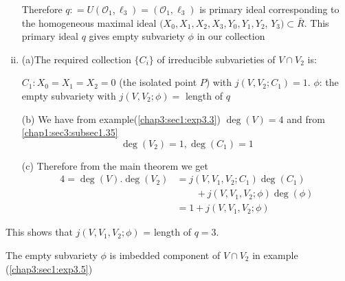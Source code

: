 \begin{example}
\begin{enumerate}[(i)]
   Therefore $q:  = U(\mathscr{O}_1, \ell_3) = (\mathscr{O}_1, \ell_3)
   $ is primary ideal corresponding to the homogeneous maximal ideal
   $(X_0,X_1,X_2,X_3, Y_0,Y_1,Y_2$, $Y_3) \subset \bar{R}$. This primary
   ideal $q$ gives empty subvariety $\phi$ in our collection  

  \item (a)\pageoriginale The required collection $\{C_i\}$ of irreducible
    subvarieties of $V \cap V_2$ is:  

    $C_1:  X_0 = X_1 = X_2 = 0$ (the isolated point $P$) with $j (V,
    V_2 ; C_1) =1$. $\phi$: the empty subvariety with $j (V, V_2 ;
    \phi) =$ length of $q$ 

    (b) We have from example(\ref{chap3:sec1:exp3.3}) $\deg (V) = 4$
    and from \ref{chap1:sec3:subsec1.35} 
    $$
    \deg (V_2) = 1, \deg (C_1) = 1 
    $$
    
    (c) Therefore from the main theorem we get  
    \begin{align*}
      4 = \deg (V). \deg (V_2) &= j(V, V_1,V_2 ;C_1) \deg (C_1)\\ 
      & \qquad + j(V, V_1, V_2 ; \phi) \deg (\phi)\\ 
      &=1+j (V, V_1, V_2 ; \phi)
    \end{align*}
\end{enumerate}
\end{example}

    This shows that $j (V, V_1, V_2 ; \phi)$ = length of $q = 3$.

\setcounter{remark}{5}
\begin{remark}\label{chap3:sec1:rem3.6}
  The empty subvariety $\phi$ is imbedded component of $V \cap V_2$ in
  example (\ref{chap3:sec1:exp3.5}) 
\end{remark}

